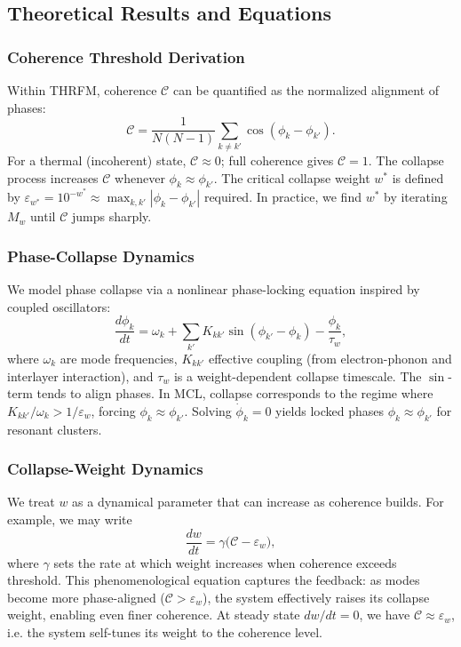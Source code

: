 \documentclass[11pt,a4paper]{article}
\begin{document}
\subsection{Theoretical Results and Equations}
\label{subsec:theoretical_results_equations_detailed}

\subsubsection{Coherence Threshold Derivation}
\label{ssubsec:coherence_threshold_derivation_detailed}
Within THRFM, coherence $\mathcal{C}$ can be quantified as the normalized alignment of phases:
\begin{equation}
\mathcal{C} = \frac{1}{N(N-1)}\sum_{k\neq k'} \cos(\phi_k - \phi_{k'}).
\end{equation}
For a thermal (incoherent) state, $\mathcal{C} \approx 0$; full coherence gives $\mathcal{C}=1$. The collapse process increases $\mathcal{C}$ whenever $\phi_k \approx \phi_{k'}$. The critical collapse weight $w^*$ is defined by $\varepsilon_{w^*} = 10^{-w^*} \approx \max_{k,k'} |\phi_k-\phi_{k'}|$ required. In practice, we find $w^*$ by iterating $M_w$ until $\mathcal{C}$ jumps sharply.

\subsubsection{Phase-Collapse Dynamics}
\label{ssubsec:phase_collapse_dynamics_detailed}
We model phase collapse via a nonlinear phase-locking equation inspired by coupled oscillators:
\begin{equation}
\frac{d\phi_k}{dt} = \omega_k + \sum_{k'} K_{kk'}\sin(\phi_{k'}-\phi_k) - \frac{\phi_k}{\tau_w},
\end{equation}
where $\omega_k$ are mode frequencies, $K_{kk'}$ effective coupling (from electron-phonon and interlayer interaction), and $\tau_w$ is a weight-dependent collapse timescale. The $\sin$-term tends to align phases. In MCL, collapse corresponds to the regime where $K_{kk'}/\omega_k > 1/\varepsilon_w$, forcing $\phi_k \approx \phi_{k'}$. Solving $\dot{\phi}_k=0$ yields locked phases $\phi_k \approx \phi_{k'}$ for resonant clusters.

\subsubsection{Collapse-Weight Dynamics}
\label{ssubsec:collapse_weight_dynamics_detailed}
We treat $w$ as a dynamical parameter that can increase as coherence builds. For example, we may write
\begin{equation}
\frac{dw}{dt} = \gamma\big(\mathcal{C} - \varepsilon_w\big),
\end{equation}
where $\gamma$ sets the rate at which weight increases when coherence exceeds threshold. This phenomenological equation captures the feedback: as modes become more phase-aligned ($\mathcal{C} > \varepsilon_w$), the system effectively raises its collapse weight, enabling even finer coherence. At steady state $dw/dt=0$, we have $\mathcal{C} \approx \varepsilon_w$, i.e. the system self-tunes its weight to the coherence level.
\end{document}
